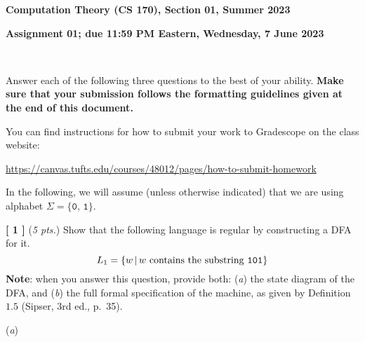 \documentclass[leqno,11pt]{article}
\newcommand{\set}[1]%
	{\ensuremath{ \{ #1 \} }}
\newcommand{\suth}{\ensuremath{ \,|\, }}
\newcommand{\qn}[1]%
	{\noindent \textbf{[ #1 ]}\quad}
\begin{document}
\begin{center}
{\large
\textbf{Computation Theory (CS 170), Section 01, Summer 2023} \\
\rule{0pt}{1em} \textbf{Assignment 01; due 11:59 PM Eastern, Wednesday, 7 June 2023}
}
\\
\hrulefill
\end{center}

\noindent 
Answer each of the following three questions to the best of your ability.  \textbf{Make sure that your
submission follows the formatting guidelines given at the end of this document.}

\vspace{4pt}\noindent 
You can find instructions for how to submit your work to Gradescope on the class website:
\begin{center}
	\href{https://canvas.tufts.edu/courses/48012/pages/how-to-submit-homework}
	{https://canvas.tufts.edu/courses/48012/pages/how-to-submit-homework}
\end{center}
 
\hrulefill 

\vspace{4pt}
\noindent 
In the following, we will assume (unless otherwise indicated) that we are using alphabet $\Sigma =
\set{\texttt{0},\, \texttt{1}}$.


\vspace{10pt}

\qn{1} (\emph{5 pts.}) Show that the following language is regular by constructing a DFA for it.
\[
	L_1 = \set{w \suth w \text{ contains the substring \texttt{101}}}
\]
\textbf{Note}: when you answer this question, provide both: (\emph{a}) the state diagram of the DFA, and
(\emph{b}) the full formal specification of the machine, as given by Definition $1.5$ (Sipser, 3rd ed., p.\
35).



(\emph{a})
\end{document}
